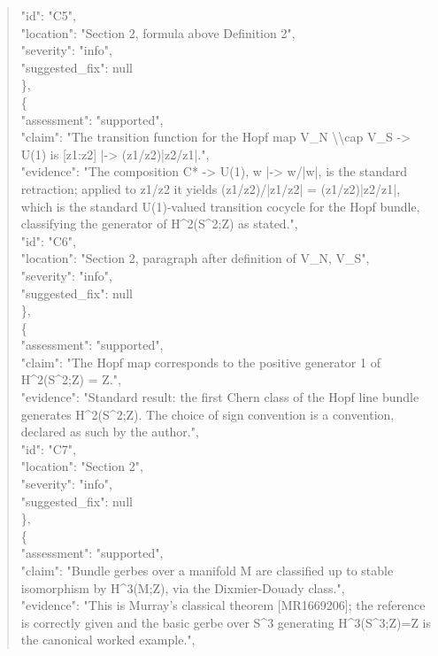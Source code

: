 \documentclass[11pt]{article}
\begin{document}
\begin{quote}
      "id": "C5",\\
      "location": "Section 2, formula above Definition 2",\\
      "severity": "info",\\
      "suggested\_fix": null\\
    \},\\
    \{\\
      "assessment": "supported",\\
      "claim": "The transition function for the Hopf map V\_N \textbackslash{}\textbackslash{}cap V\_S -> U(1) is [z1:z2] |-> (z1/z2)|z2/z1|.",\\
      "evidence": "The composition C* -> U(1), w |-> w/|w|, is the standard retraction; applied to z1/z2 it yields (z1/z2)/|z1/z2| = (z1/z2)|z2/z1|, which is the standard U(1)-valued transition cocycle for the Hopf bundle, classifying the generator of H\^{}2(S\^{}2;Z) as stated.",\\
      "id": "C6",\\
      "location": "Section 2, paragraph after definition of V\_N, V\_S",\\
      "severity": "info",\\
      "suggested\_fix": null\\
    \},\\
    \{\\
      "assessment": "supported",\\
      "claim": "The Hopf map corresponds to the positive generator 1 of H\^{}2(S\^{}2;Z) = Z.",\\
      "evidence": "Standard result: the first Chern class of the Hopf line bundle generates H\^{}2(S\^{}2;Z). The choice of sign convention is a convention, declared as such by the author.",\\
      "id": "C7",\\
      "location": "Section 2",\\
      "severity": "info",\\
      "suggested\_fix": null\\
    \},\\
    \{\\
      "assessment": "supported",\\
      "claim": "Bundle gerbes over a manifold M are classified up to stable isomorphism by H\^{}3(M;Z), via the Dixmier-Douady class.",\\
      "evidence": "This is Murray's classical theorem [MR1669206]; the reference is correctly given and the basic gerbe over S\^{}3 generating H\^{}3(S\^{}3;Z)=Z is the canonical worked example.",\\

\end{quote}
\end{document}
